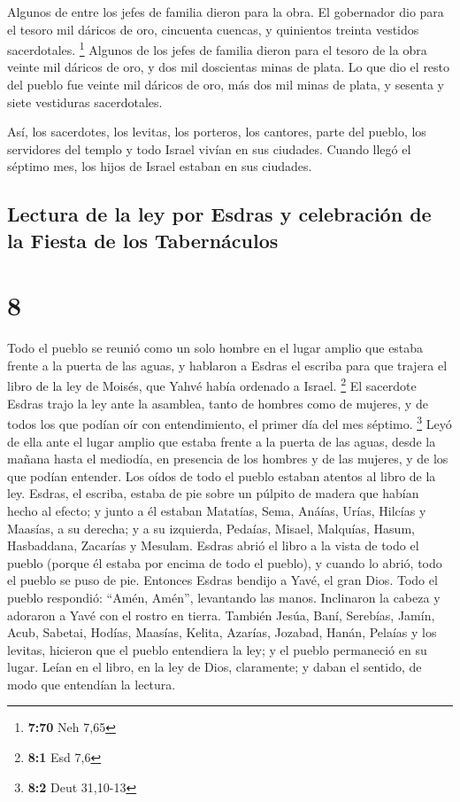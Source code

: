  Algunos de entre los jefes de familia dieron para la
obra. El gobernador dio para el tesoro mil dáricos de oro, cincuenta
cuencas, y quinientos treinta vestidos sacerdotales. \footnote{\textbf{7:70}
  Neh 7,65}  Algunos de los jefes de familia dieron para
el tesoro de la obra veinte mil dáricos de oro, y dos mil doscientas
minas de plata.  Lo que dio el resto del pueblo fue
veinte mil dáricos de oro, más dos mil minas de plata, y sesenta y siete
vestiduras sacerdotales.

 Así, los sacerdotes, los levitas, los porteros, los
cantores, parte del pueblo, los servidores del templo y todo Israel
vivían en sus ciudades. Cuando llegó el séptimo mes, los hijos de Israel
estaban en sus ciudades.

\hypertarget{lectura-de-la-ley-por-esdras-y-celebraciuxf3n-de-la-fiesta-de-los-tabernuxe1culos}{%
\subsection{Lectura de la ley por Esdras y celebración de la Fiesta de
los
Tabernáculos}\label{lectura-de-la-ley-por-esdras-y-celebraciuxf3n-de-la-fiesta-de-los-tabernuxe1culos}}

\hypertarget{section-7}{%
\section{8}\label{section-7}}

 Todo el pueblo se reunió como un solo hombre en el lugar
amplio que estaba frente a la puerta de las aguas, y hablaron a Esdras
el escriba para que trajera el libro de la ley de Moisés, que Yahvé
había ordenado a Israel. \footnote{\textbf{8:1} Esd 7,6} 
El sacerdote Esdras trajo la ley ante la asamblea, tanto de hombres como
de mujeres, y de todos los que podían oír con entendimiento, el primer
día del mes séptimo. \footnote{\textbf{8:2} Deut 31,10-13}
 Leyó de ella ante el lugar amplio que estaba frente a la
puerta de las aguas, desde la mañana hasta el mediodía, en presencia de
los hombres y de las mujeres, y de los que podían entender. Los oídos de
todo el pueblo estaban atentos al libro de la ley. 
Esdras, el escriba, estaba de pie sobre un púlpito de madera que habían
hecho al efecto; y junto a él estaban Matatías, Sema, Anáías, Urías,
Hilcías y Maasías, a su derecha; y a su izquierda, Pedaías, Misael,
Malquías, Hasum, Hasbaddana, Zacarías y Mesulam.  Esdras
abrió el libro a la vista de todo el pueblo (porque él estaba por encima
de todo el pueblo), y cuando lo abrió, todo el pueblo se puso de pie.
 Entonces Esdras bendijo a Yavé, el gran Dios. Todo el
pueblo respondió: ``Amén, Amén'', levantando las manos. Inclinaron la
cabeza y adoraron a Yavé con el rostro en tierra.  También
Jesúa, Baní, Serebías, Jamín, Acub, Sabetai, Hodías, Maasías, Kelita,
Azarías, Jozabad, Hanán, Pelaías y los levitas, hicieron que el pueblo
entendiera la ley; y el pueblo permaneció en su lugar. 
Leían en el libro, en la ley de Dios, claramente; y daban el sentido, de
modo que entendían la lectura.

